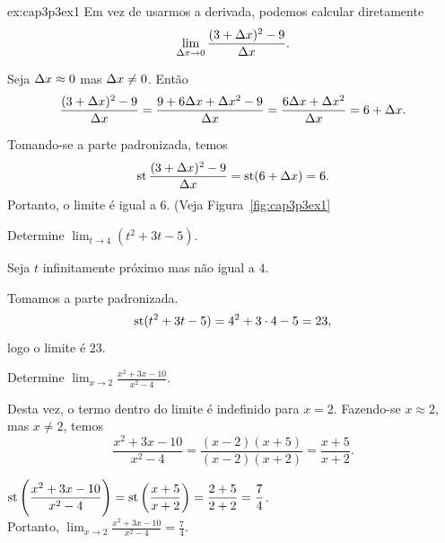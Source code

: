 \begin{examplecont}{ex:cap3p3ex1}
  Em vez de usarmos a derivada, podemos calcular diretamente
  $$
    \lim_{\Delta x \to 0} \frac{(3 + \Delta x)^2 - 9}{\Delta x}.
  $$
  \begin{stepanalysis}
    \item Seja $\Delta x \approx 0$ mas $\Delta x \ne 0$. Então
    $$
      \frac{(3 + \Delta x)^2 - 9}{\Delta x} = \frac{9 + 6 \Delta x + \Delta x^2 - 9}{\Delta x} =
        \frac{6 \Delta x + \Delta x^2}{\Delta x} = 6 + \Delta x.
    $$
    \item Tomando-se a parte padronizada, temos
    $$
      \operatorname{st} \frac{(3 + \Delta x)^2 - 9}{\Delta x} = \operatorname{st}(6 + \Delta x) = 6.
    $$
    Portanto, o limite é igual a $6$. (Veja Figura~\ref{fig:cap3p3ex1}
  \end{stepanalysis}
\end{examplecont}


\begin{example}
  Determine $\displaystyle \lim_{t \to 4} (t^2 + 3t - 5)$.

  \begin{stepanalysis}
    \item Seja $t$ infinitamente próximo mas não igual a $4$.
    \item Tomamos a parte padronizada.
    $$
      \operatorname{st}(t^2 + 3t - 5) = 4^2 + 3 \cdot 4 - 5 = 23,
    $$
    logo o limite é $23$.
  \end{stepanalysis}
\end{example}

\begin{example}
  Determine $\displaystyle \lim_{x \to 2} \frac{x^2 + 3x - 10}{x^2 - 4}$.

  \begin{stepanalysis}
    \item Desta vez, o termo dentro do limite é indefinido para $x = 2$.
    Fazendo-se $x \approx 2$, mas $x \ne 2$, temos
    $$
      \frac{x^2 + 3x - 10}{x^2 - 4} = \frac{(x - 2)(x + 5)}{(x - 2)(x + 2)}
        = \frac{x + 5}{x + 2}.
    $$
    \item $\displaystyle \operatorname{st}\left(\frac{x^2 + 3x - 10}{x^2 - 4}\right) =
             \operatorname{st}\left(\frac{x + 5}{x + 2}\right) = \frac{2 + 5}{2 + 2} = \frac{7}{4}$.\\
    Portanto, \hspace{1.5em}
      $\displaystyle \lim_{x \to 2} \frac{x^2 + 3x - 10}{x^2 - 4} =
        \frac{7}{4}$.
  \end{stepanalysis}
\end{example}

